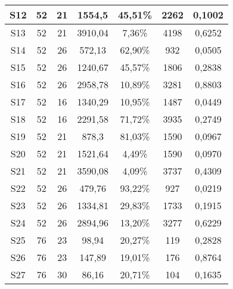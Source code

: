 \documentclass[11pt]{article}
\begin{document}
\begin{table}[H]
\begin{tabular}{|c|c|c|c|c|c|c|}
S12                 & 52         & 21         & 1554,5                & 45,51\%      & 2262              & 0,1002          \\ \hline
S13                 & 52         & 21         & 3910,04               & 7,36\%       & 4198              & 0,6252          \\ \hline
S14                 & 52         & 26         & 572,13                & 62,90\%      & 932               & 0,0505          \\ \hline
S15                 & 52         & 26         & 1240,67               & 45,57\%      & 1806              & 0,2838          \\ \hline
S16                 & 52         & 26         & 2958,78               & 10,89\%      & 3281              & 0,8803          \\ \hline
S17                 & 52         & 16         & 1340,29               & 10,95\%      & 1487              & 0,0449          \\ \hline
S18                 & 52         & 16         & 2291,58               & 71,72\%      & 3935              & 0,2749          \\ \hline
S19                 & 52         & 21         & 878,3                 & 81,03\%      & 1590              & 0,0967          \\ \hline
S20                 & 52         & 21         & 1521,64               & 4,49\%       & 1590              & 0,0970          \\ \hline
S21                 & 52         & 21         & 3590,08               & 4,09\%       & 3737              & 0,4309          \\ \hline
S22                 & 52         & 26         & 479,76                & 93,22\%      & 927               & 0,0219          \\ \hline
S23                 & 52         & 26         & 1334,81               & 29,83\%      & 1733              & 0,1915          \\ \hline
S24                 & 52         & 26         & 2894,96               & 13,20\%      & 3277              & 0,6229          \\ \hline
S25                 & 76         & 23         & 98,94                 & 20,27\%      & 119               & 0,2828          \\ \hline
S26                 & 76         & 23         & 147,89                & 19,01\%      & 176               & 0,8764          \\ \hline
S27                 & 76         & 30         & 86,16                 & 20,71\%      & 104               & 0,1635          \\ \hline

\end{tabular}
\end{table}
\end{document}
